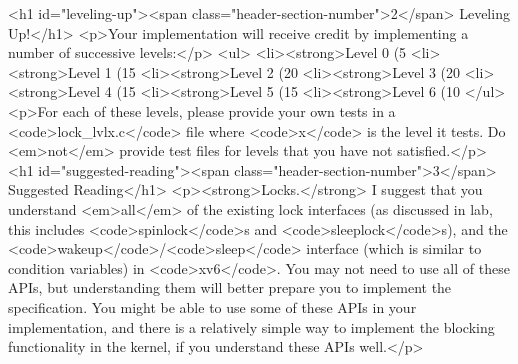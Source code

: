 \documentclass[]{}
\begin{document}
<h1 id="leveling-up"><span class="header-section-number">2</span> Leveling Up!</h1>
<p>Your implementation will receive credit by implementing a number of successive levels:</p>
<ul>
<li><strong>Level 0 (5%
<li><strong>Level 1 (15%
<li><strong>Level 2 (20%
<li><strong>Level 3 (20%
<li><strong>Level 4 (15%
<li><strong>Level 5 (15%
<li><strong>Level 6 (10%
</ul>
<p>For each of these levels, please provide your own tests in a <code>lock_lvlx.c</code> file where <code>x</code> is the level it tests. Do <em>not</em> provide test files for levels that you have not satisfied.</p>
<h1 id="suggested-reading"><span class="header-section-number">3</span> Suggested Reading</h1>
<p><strong>Locks.</strong> I suggest that you understand <em>all</em> of the existing lock interfaces (as discussed in lab, this includes <code>spinlock</code>s and <code>sleeplock</code>s), and the <code>wakeup</code>/<code>sleep</code> interface (which is similar to condition variables) in <code>xv6</code>. You may not need to use all of these APIs, but understanding them will better prepare you to implement the specification. You might be able to use some of these APIs in your implementation, and there is a relatively simple way to implement the blocking functionality in the kernel, if you understand these APIs well.</p>
\end{document}
